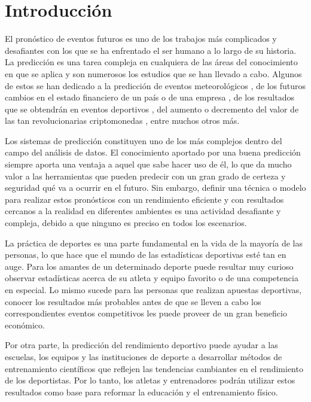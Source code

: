 \chapter*{Introducción}\label{chapter:introduction}

El pronóstico de eventos futuros es uno de los trabajos más complicados y desafiantes con los que se ha enfrentado el ser humano a lo largo de su historia. La predicción es una tarea compleja en cualquiera de las áreas del conocimiento en que se aplica y son numerosos los estudios que se han llevado a cabo. Algunos de estos se han dedicado a la predicción de eventos meteorológicos \cite{watson2022improved}\cite{powers2007numerical}, de los futuros cambios en el estado financiero de un país o de una empresa \cite{morris2010measuring}\cite{gilardoni2017recurrent}, de los resultados que se obtendrán en eventos deportivos \cite{vaz2012forecasting}\cite{constantinou2012pi}, del aumento o decremento del valor de las tan revolucionarias criptomonedas \cite{bohte2019comparing}, entre muchos otros más. 

Los sistemas de predicción constituyen uno de los más complejos dentro del campo del análisis de datos. El conocimiento aportado por una buena predicción siempre aporta una ventaja a aquel que sabe hacer uso de él, lo que da mucho valor a las herramientas que pueden predecir con un gran grado de certeza y seguridad qué va a ocurrir en el futuro. Sin embargo, definir una técnica o modelo para realizar estos pronósticos con un rendimiento eficiente y con resultados cercanos a la realidad en diferentes ambientes es una actividad desafiante y compleja, debido a que ninguno es preciso en todos los escenarios.

La práctica de deportes es una parte fundamental en la vida de la mayoría de las personas, lo que hace que el mundo de las estadísticas deportivas esté tan en auge. Para los amantes de un determinado deporte puede resultar muy curioso observar estadísticas acerca de su atleta y equipo favorito o de una competencia en especial. Lo mismo sucede para las personas que realizan apuestas deportivas, conocer los resultados más probables antes de que se lleven a cabo los correspondientes eventos competitivos les puede proveer de un gran beneficio económico. 

Por otra parte, la predicción del rendimiento deportivo puede ayudar a las escuelas, los equipos y las instituciones de deporte a desarrollar métodos de entrenamiento científicos que reflejen las tendencias cambiantes en el rendimiento de los deportistas. Por lo tanto, los atletas y entrenadores podrán utilizar estos resultados como base para reformar la educación y el entrenamiento físico. 

